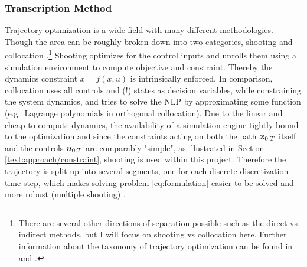 \subsubsection{Transcription Method} 
Trajectory optimization is a wide field with many different methodologies. Though the area can be roughly broken down into two categories, shooting and collocation \cite{Kelly2017}.\footnote{There are several other directions of separation possible such as the direct vs indirect methods, but I will focus on shooting vs collocation here. Further information about the taxonomy of trajectory optimization can be found in \cite{Kelly2017} and \cite{Chai2020}.} Shooting optimizes for the control inputs and unrolls them using a simulation environment to compute objective and constraint. Thereby the dynamics constraint $x = f(x, u)$ is intrinsically enforced. In comparison, collocation uses all controls and (!) states as decision variables, while constraining the system dynamics, and tries to solve the \ac{NLP} by approximating some function (e.g.\ Lagrange polynomials in orthogonal collocation). Due to the linear and cheap to compute dynamics, the availability of a simulation engine tightly bound to the optimization and since the constraints acting on both the path $\boldsymbol{x}_{0:T}$ itself and the controls $\boldsymbol{u}_{0:T}$ are comparably "simple", as illustrated in Section \ref{text:approach/constraint}, shooting is used within this project. Therefore the trajectory is split up into several segments, one for each discrete discretization time step, which makes solving problem \ref{eq:formulation} easier to be solved and more robust (multiple shooting) \cite{Betts1998}.

